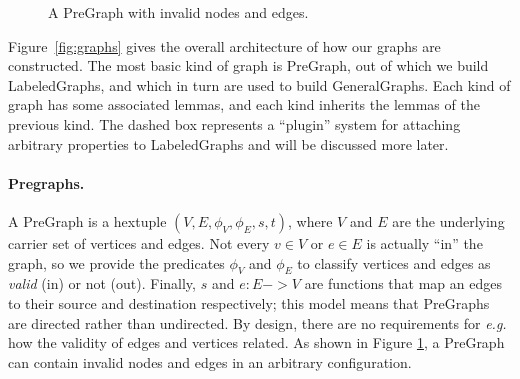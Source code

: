 \begin{figure}[t]
\centering
{}
\endpgfgraphicnamed
\vspace{1ex}
\caption{A PreGraph with invalid nodes and edges.}\label{fig:pregraph}
\end{figure}

Figure~\ref{fig:graphs} gives the overall architecture of how our graphs are constructed.
The most basic kind of graph is PreGraph, out of which we build LabeledGraphs, and which in turn are used
to build GeneralGraphs.  Each kind of graph has some associated lemmas, and each kind inherits the lemmas of the previous kind.  The dashed box represents a ``plugin'' system for attaching arbitrary properties to LabeledGraphs and will be discussed more later. %

\paragraph{Pregraphs.} A PreGraph is a hextuple $(V, E, \phi_V, \phi_E, s, t)$,
where $V$ and $E$ are the underlying carrier set of vertices and edges.  Not every $v \in V$ or $e \in E$ is actually ``in'' the graph, so we provide the predicates $\phi_V$ and $\phi_E$ to classify vertices and edges as \emph{valid} (in) or not (out).  Finally, $s$ and $e : E -> V$ are functions that map an edges to their source and destination respectively; this model means that PreGraphs are directed rather than undirected.  By design, there are no requirements for \emph{e.g.} how the validity of edges and vertices related.  As shown in Figure \ref{fig:pregraph}, a PreGraph can contain invalid nodes and edges in an arbitrary configuration.

